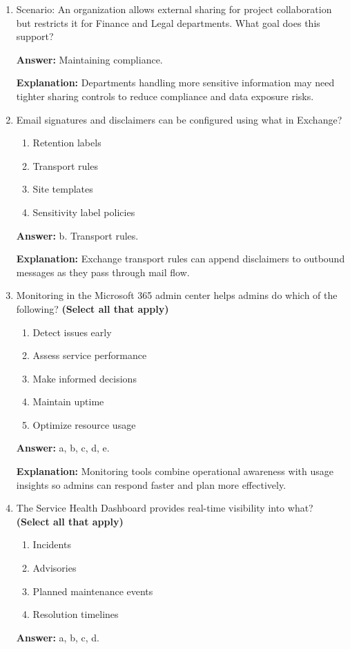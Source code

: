 \documentclass[10pt]{article}
\begin{document}
\begin{enumerate}[leftmargin=*]
\item Scenario: An organization allows external sharing for project collaboration but restricts it for Finance and Legal departments. What goal does this support?

\textbf{Answer:} Maintaining compliance.

\textbf{Explanation:} Departments handling more sensitive information may need tighter sharing controls to reduce compliance and data exposure risks.

\item Email signatures and disclaimers can be configured using what in Exchange?
\begin{enumerate}[label=\alph*., leftmargin=1.5em]
\item Retention labels
\item Transport rules
\item Site templates
\item Sensitivity label policies
\end{enumerate}
\textbf{Answer:} b. Transport rules.

\textbf{Explanation:} Exchange transport rules can append disclaimers to outbound messages as they pass through mail flow.

\item Monitoring in the Microsoft 365 admin center helps admins do which of the following? \textbf{(Select all that apply)}
\begin{enumerate}[label=\alph*., leftmargin=1.5em]
\item Detect issues early
\item Assess service performance
\item Make informed decisions
\item Maintain uptime
\item Optimize resource usage
\end{enumerate}
\textbf{Answer:} a, b, c, d, e.

\textbf{Explanation:} Monitoring tools combine operational awareness with usage insights so admins can respond faster and plan more effectively.

\item The Service Health Dashboard provides real-time visibility into what? \textbf{(Select all that apply)}
\begin{enumerate}[label=\alph*., leftmargin=1.5em]
\item Incidents
\item Advisories
\item Planned maintenance events
\item Resolution timelines
\end{enumerate}
\textbf{Answer:} a, b, c, d.


\end{enumerate}
\end{document}
